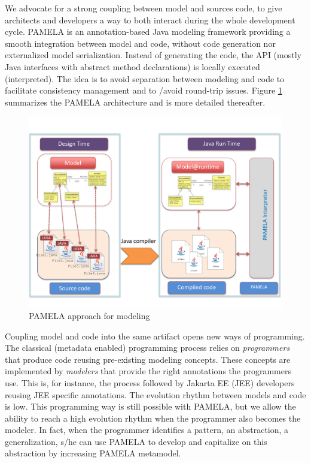 We advocate for a strong coupling between model and sources code, to give architects and developers a way to both interact during the whole development cycle. PAMELA is an annotation-based Java modeling framework providing a smooth integration between model and code, without code generation nor externalized model serialization. Instead of generating the code, the API (mostly Java interfaces with abstract method declarations) is locally executed (interpreted). The idea is to avoid separation between modeling and code to facilitate consistency management and to /avoid round-trip issues. Figure \ref{fig:PamelaVision} summarizes the PAMELA architecture and is more detailed thereafter.  

\begin{figure}
    \centering
    \includegraphics[width=1.0 \columnwidth]{PamelaVisionV2.pdf}
    \caption{PAMELA approach for modeling}
    \label{fig:PamelaVision}
\end{figure}


Coupling model and code into the same artifact opens new ways of programming. The classical (metadata enabled) programming process relies on \emph{programmers} that produce code reusing pre-existing modeling concepts. These concepts are implemented by \emph{modelers} that provide the right annotations the programmers use. This is, for instance, the process followed by Jakarta EE (JEE) developers reusing JEE specific annotations. The evolution rhythm between models and code is low. This programming way is still possible with PAMELA, but we allow the ability to reach a high evolution rhythm when the programmer also becomes the modeler. In fact, when the programmer identifies a pattern, an abstraction, a generalization, s/he can use PAMELA to develop and capitalize on this abstraction by increasing PAMELA metamodel. 

